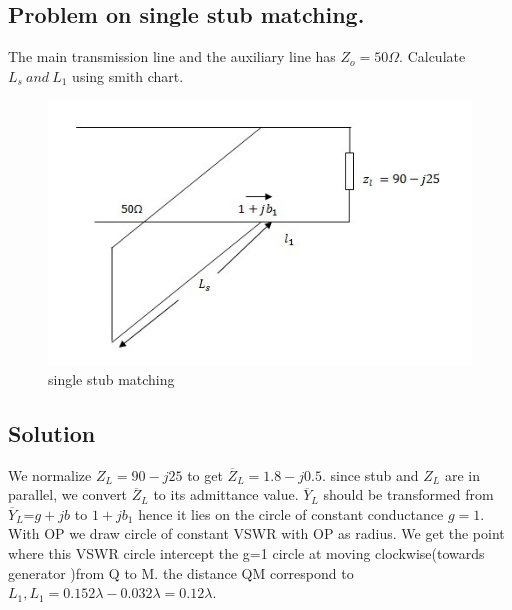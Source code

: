 \begin{example}
\subsection*{Problem on single stub matching.}
The main transmission line and the auxiliary line has $Z_o=50\varOmega$. Calculate $L_s\ and\ L_1$ using smith chart.
\begin{figure}[h]
\centering
\includegraphics[width=1\linewidth]{./graphics/figw}
\caption{single stub matching}
\end{figure}
\subsection*{Solution}
We normalize $Z_L=90-j25$ to get 
$\overline{Z}_L=1.8-j0.5$. since stub and $Z_L$ are in parallel,
we convert $\overline{Z}_L$ to its admittance value. $\overline{Y}_{L}$
should be transformed from 
$\overline{Y}_{L}$=$g+jb$ to $1+jb_1$ hence it lies  on  the circle of constant conductance $g=1$. With OP we draw circle of constant VSWR with OP as radius. We get the point where this VSWR circle intercept the g=1 circle at moving clockwise(towards generator )from Q to M. the distance QM correspond to $L_1, L_1=0.152\lambda-0.032\lambda=0.12\lambda$.


\end{example}
